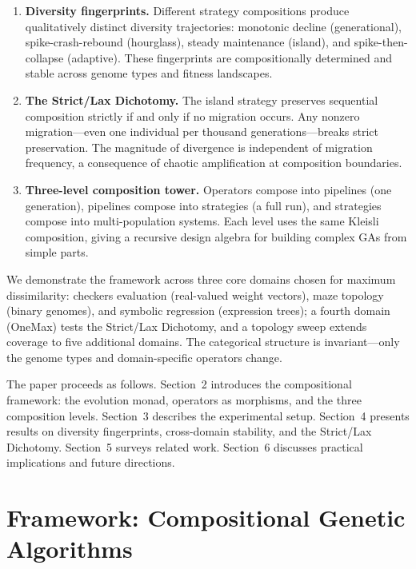 \documentclass[sigconf]{acmart}
\begin{document}
\begin{enumerate}[nosep]
  \item \textbf{Diversity fingerprints.} Different strategy compositions produce qualitatively distinct diversity trajectories: monotonic decline (generational), spike-crash-rebound (hourglass), steady maintenance (island), and spike-then-collapse (adaptive). These fingerprints are compositionally determined and stable across genome types and fitness landscapes.

  \item \textbf{The Strict/Lax Dichotomy.} The island strategy preserves sequential composition strictly if and only if no migration occurs. Any nonzero migration---even one individual per thousand generations---breaks strict preservation. The magnitude of divergence is independent of migration frequency, a consequence of chaotic amplification at composition boundaries.

  \item \textbf{Three-level composition tower.} Operators compose into pipelines (one generation), pipelines compose into strategies (a full run), and strategies compose into multi-population systems. Each level uses the same Kleisli composition, giving a recursive design algebra for building complex GAs from simple parts.
\end{enumerate}

We demonstrate the framework across three core domains chosen for maximum dissimilarity: checkers evaluation (real-valued weight vectors), maze topology (binary genomes), and symbolic regression (expression trees); a fourth domain (OneMax) tests the Strict/Lax Dichotomy, and a topology sweep extends coverage to five additional domains. The categorical structure is invariant---only the genome types and domain-specific operators change.

The paper proceeds as follows. Section~2 introduces the compositional framework: the evolution monad, operators as morphisms, and the three composition levels. Section~3 describes the experimental setup. Section~4 presents results on diversity fingerprints, cross-domain stability, and the Strict/Lax Dichotomy. Section~5 surveys related work. Section~6 discusses practical implications and future directions.

\section{Framework: Compositional Genetic Algorithms}
\end{document}
